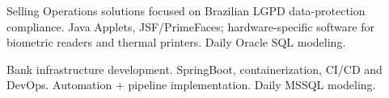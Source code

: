 \documentclass[10pt,a4paper,ragged2e]{altacv}
\begin{document}
\divider

Selling Operations solutions focused on Brazilian LGPD data-protection compliance. Java Applets, JSF/PrimeFaces; hardware-specific software for biometric readers and thermal printers. Daily Oracle SQL modeling.\\

\divider

Bank infrastructure development. SpringBoot, containerization, CI/CD and DevOps. Automation + pipeline implementation. Daily MSSQL modeling.\\

\clearpage
\end{document}
